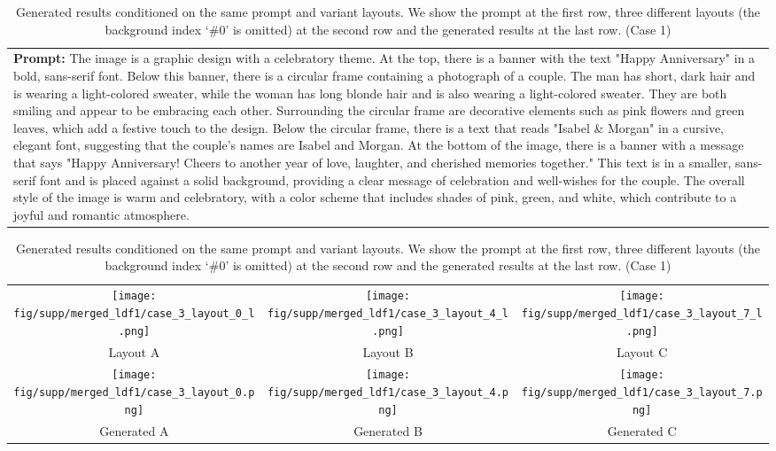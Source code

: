 \begin{table}[htbp]
    \centering
    \begin{tabular}{p{\textwidth}}
    \toprule
    \textbf{Prompt:} \small{The image is a graphic design with a celebratory theme. At the top, there is a banner with the text "Happy Anniversary" in a bold, sans-serif font. Below this banner, there is a circular frame containing a photograph of a couple. The man has short, dark hair and is wearing a light-colored sweater, while the woman has long blonde hair and is also wearing a light-colored sweater. They are both smiling and appear to be embracing each other. Surrounding the circular frame are decorative elements such as pink flowers and green leaves, which add a festive touch to the design. Below the circular frame, there is a text that reads "Isabel \& Morgan" in a cursive, elegant font, suggesting that the couple's names are Isabel and Morgan. At the bottom of the image, there is a banner with a message that says "Happy Anniversary! Cheers to another year of love, laughter, and cherished memories together." This text is in a smaller, sans-serif font and is placed against a solid background, providing a clear message of celebration and well-wishes for the couple. The overall style of the image is warm and celebratory, with a color scheme that includes shades of pink, green, and white, which contribute to a joyful and romantic atmosphere.}
    \vspace{1em}
    \end{tabular}
    \begin{tabular}{ccc}
        \texttt{[image: fig/supp/merged\_ldf1/case\_3\_layout\_0\_l.png]} &
        \texttt{[image: fig/supp/merged\_ldf1/case\_3\_layout\_4\_l.png]} &
        \texttt{[image: fig/supp/merged\_ldf1/case\_3\_layout\_7\_l.png]} \\
        \small{Layout A} & \small{Layout B} & \small{Layout C} \\[1em]
        \texttt{[image: fig/supp/merged\_ldf1/case\_3\_layout\_0.png]} &
        \texttt{[image: fig/supp/merged\_ldf1/case\_3\_layout\_4.png]} &
        \texttt{[image: fig/supp/merged\_ldf1/case\_3\_layout\_7.png]} \\
        \small{Generated A} & \small{Generated B} & \small{Generated C} \\
        \bottomrule
    \end{tabular}

    \caption{Generated results conditioned on the same prompt and variant layouts. We show the prompt at the first row, three different layouts (the background index `\#0' is omitted) at the second row and the generated results at the last row. (Case 1)}
    \label{tab:variant_layout1}
\end{table}

